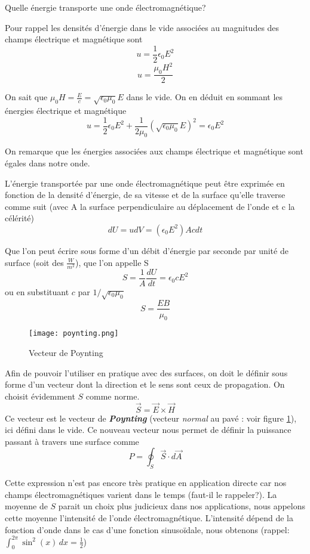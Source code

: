 Quelle énergie transporte une onde électromagnétique?

Pour rappel les densités d'énergie dans le vide associées au magnitudes des champs électrique et magnétique sont 
\[u=\frac{1}{2}\epsilon_0E^{2}\]
\[u=\frac{\mu_0H^{2}}{2}\]

On sait que $\mu_0H=\frac{E}{c}=\sqrt{ \epsilon_0 \mu_0 }E$ dans le vide. On en déduit en sommant les énergies électrique et magnétique
\[u=\frac{1}{2}\epsilon_0E^{2} + \frac{1}{2\mu_0}(\sqrt{ \epsilon_0 \mu_0 }E)^{2} = \epsilon_0E^{2}\]

On remarque que les énergies associées aux champs électrique et magnétique sont égales dans notre onde.

L'énergie transportée par une onde électromagnétique peut être exprimée en fonction de la densité d'énergie, de sa vitesse et de la surface qu'elle traverse comme suit (avec A la surface perpendiculaire au déplacement de l'onde et c la célérité)
\[dU=udV=(\epsilon_0E^{2})Ac dt\]

Que l'on peut écrire sous forme d'un débit d'énergie par seconde par unité de surface (soit des $\frac{W}{m^{2}}$), que l'on appelle S
\[S=\frac{1}{A}\frac{dU}{dt}=\epsilon_0cE^{2}\]
ou en substituant $c$ par $1/\sqrt{\epsilon_0 \mu_0}$
\[S=\frac{EB}{\mu_0}\]

\begin{figure}
	\centering
	\texttt{[image: poynting.png]}
	\caption{Vecteur de Poynting}
	\label{poynting}
\end{figure}

Afin de pouvoir l'utiliser en pratique avec des surfaces, on doit le définir sous forme d'un vecteur dont la direction et le sens sont ceux de propagation. On choisit évidemment $S$ comme norme.
\[\vec{S}=\vec{E} \times \vec{H} \]
Ce vecteur est le vecteur de \textit{\textbf{Poynting}} (vecteur \textit{normal} au pavé : voir figure \ref{poynting}), ici défini dans le vide.
Ce nouveau vecteur nous permet de définir la puissance passant à travers une surface comme
\[P=\oint_{S}\vec{S} \cdot d\vec{A}\] %

Cette expression n'est pas encore très pratique en application directe car nos champs électromagnétiques varient dans le temps (faut-il le rappeler?). La moyenne de $S$ parait un choix plus judicieux dans nos applications, nous appelons cette moyenne l'intensité de l'onde électromagnétique. L'intensité dépend de la fonction d'onde dans le cas  d'une fonction sinusoïdale, nous obtenons (rappel: $\int_0^{2\pi} \sin^{2}(x) \, dx = \frac{1}{2}$)

